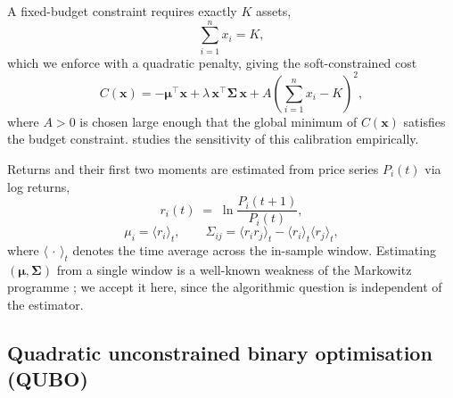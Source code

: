 A fixed-budget constraint requires exactly $K$ assets,
\begin{equation}
    \sum_{i=1}^{n} x_i = K,
\end{equation}
which we enforce with a quadratic penalty, giving the soft-constrained cost
\begin{equation}\label{eq:Cx}
    C(\boldsymbol{x}) = -\boldsymbol\mu^\top \boldsymbol{x} + \lambda\, \boldsymbol{x}^\top \boldsymbol\Sigma\, \boldsymbol{x} + A \left( \sum_{i=1}^{n} x_i - K \right)^2,
\end{equation}
where $A > 0$ is chosen large enough that the global minimum of $C(\boldsymbol{x})$ satisfies the budget constraint.  studies the sensitivity of this calibration empirically.

Returns and their first two moments are estimated from price series $P_i(t)$ via log returns,
\begin{equation}\label{eq:logreturn}
    r_i(t) \;=\; \ln\frac{P_i(t+1)}{P_i(t)},
\end{equation}
\begin{equation}
    \mu_i = \langle r_i \rangle_t,
    \qquad
    \Sigma_{ij} = \langle r_i r_j \rangle_t - \langle r_i \rangle_t \langle r_j \rangle_t,
\end{equation}
where $\langle\,\cdot\,\rangle_t$ denotes the time average across the in-sample window. Estimating $(\boldsymbol\mu, \boldsymbol\Sigma)$ from a single window is a well-known weakness of the Markowitz programme \autocite{hastie}; we accept it here, since the algorithmic question is independent of the estimator.


\subsection{Quadratic unconstrained binary optimisation (QUBO)}\label{subsec:qubo}

